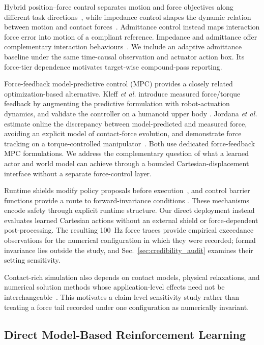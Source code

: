 Hybrid position--force control separates motion and force objectives along
different task directions~\cite{raibert1981hybrid}, while impedance control
shapes the dynamic relation between motion and contact
forces~\cite{hogan1985impedance}. Admittance control instead maps interaction
force error into motion of a compliant reference. Impedance and admittance
offer complementary interaction behaviours~\cite{ott2010unified}. We include
an adaptive admittance baseline under the same time-causal observation and
actuator action box. Its force-tier dependence motivates target-wise
compound-pass reporting.

Force-feedback model-predictive control (MPC) provides a closely related
optimization-based alternative. Kleff \emph{et al.} introduce measured
force/torque feedback by augmenting the predictive formulation with robot-actuation
dynamics, and validate the controller on a humanoid upper body
\cite{kleff2022forcefeedbackmpc}. Jordana \emph{et al.} estimate online the
discrepancy between model-predicted and measured force, avoiding an explicit
model of contact-force evolution, and demonstrate force tracking on a
torque-controlled manipulator~\cite{jordana2024forcefeedbackmpc}. Both use
dedicated force-feedback MPC formulations. We address the complementary
question of what a learned actor and world model can achieve through a bounded
Cartesian-displacement interface without a separate force-control layer.

Runtime shields modify policy proposals before
execution~\cite{alshiekh2018shielding}, and control barrier functions provide
a route to forward-invariance conditions
\cite{ames2019cbf,cheng2019rlcbf}. These mechanisms encode safety through
explicit runtime structure. Our direct deployment instead evaluates learned
Cartesian actions without an external shield or force-dependent
post-processing. The resulting 100~Hz force traces provide empirical
exceedance observations for the numerical configuration in which they were
recorded; formal invariance lies outside the study, and
Sec.~\ref{sec:credibility_audit} examines their setting sensitivity.

Contact-rich simulation also depends on contact models, physical relaxations,
and numerical solution methods whose application-level effects need not be
interchangeable~\cite{lelidec2024contact}. This motivates a claim-level
sensitivity study rather than treating a force tail recorded under one
configuration as numerically invariant.

\subsection{Direct Model-Based Reinforcement Learning}

